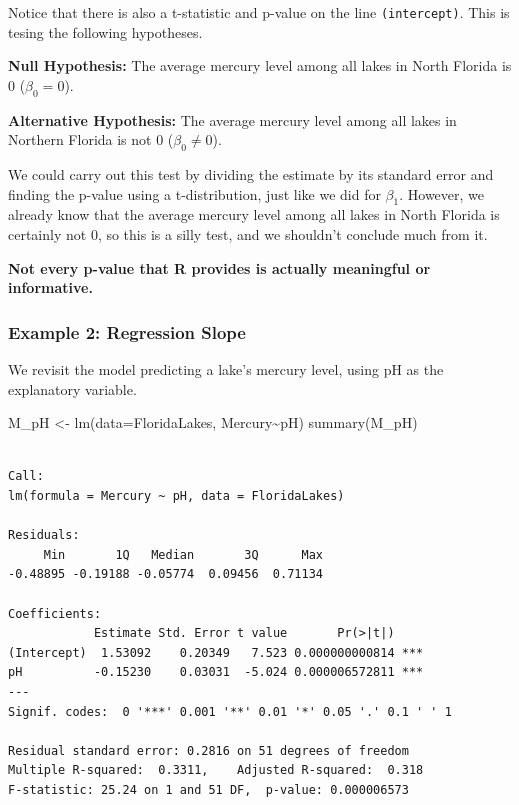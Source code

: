 \documentclass[
  letterpaper,
  DIV=11,
  numbers=noendperiod]{scrreprt}
\newenvironment{Shaded}{\begin{snugshade}}{\end{snugshade}}
\newcommand{\AttributeTok}[1]{\textcolor[rgb]{0.40,0.45,0.13}{#1}}
\newcommand{\FunctionTok}[1]{\textcolor[rgb]{0.28,0.35,0.67}{#1}}
\newcommand{\NormalTok}[1]{\textcolor[rgb]{0.00,0.23,0.31}{#1}}
\newcommand{\OtherTok}[1]{\textcolor[rgb]{0.00,0.23,0.31}{#1}}
\newcommand{\SpecialCharTok}[1]{\textcolor[rgb]{0.37,0.37,0.37}{#1}}
\begin{document}
Notice that there is also a t-statistic and p-value on the line
\texttt{(intercept)}. This is tesing the following hypotheses.

\textbf{Null Hypothesis:} The average mercury level among all lakes in
North Florida is 0 (\(\beta_0=0\)).

\textbf{Alternative Hypothesis:} The average mercury level among all
lakes in Northern Florida is not 0 (\(\beta_0\neq 0\)).

We could carry out this test by dividing the estimate by its standard
error and finding the p-value using a t-distribution, just like we did
for \(\beta_1\). However, we already know that the average mercury level
among all lakes in North Florida is certainly not 0, so this is a silly
test, and we shouldn't conclude much from it.

\textbf{Not every p-value that R provides is actually meaningful or
informative.}

\subsubsection{Example 2: Regression
Slope}\label{example-2-regression-slope}

We revisit the model predicting a lake's mercury level, using pH as the
explanatory variable.

\begin{Shaded}
\begin{Highlighting}[]
\NormalTok{M\_pH }\OtherTok{\textless{}{-}} \FunctionTok{lm}\NormalTok{(}\AttributeTok{data=}\NormalTok{FloridaLakes, Mercury}\SpecialCharTok{\textasciitilde{}}\NormalTok{pH)}
\FunctionTok{summary}\NormalTok{(M\_pH)}
\end{Highlighting}
\end{Shaded}

\begin{verbatim}

Call:
lm(formula = Mercury ~ pH, data = FloridaLakes)

Residuals:
     Min       1Q   Median       3Q      Max 
-0.48895 -0.19188 -0.05774  0.09456  0.71134 

Coefficients:
            Estimate Std. Error t value       Pr(>|t|)    
(Intercept)  1.53092    0.20349   7.523 0.000000000814 ***
pH          -0.15230    0.03031  -5.024 0.000006572811 ***
---
Signif. codes:  0 '***' 0.001 '**' 0.01 '*' 0.05 '.' 0.1 ' ' 1

Residual standard error: 0.2816 on 51 degrees of freedom
Multiple R-squared:  0.3311,    Adjusted R-squared:  0.318 
F-statistic: 25.24 on 1 and 51 DF,  p-value: 0.000006573
\end{verbatim}
\end{document}
